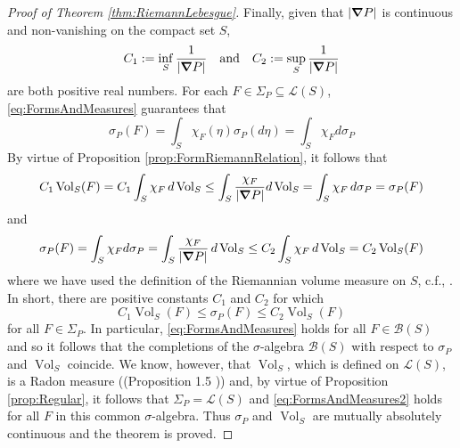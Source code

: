 \documentclass[11pt]{article}
\theoremstyle{remark}
\newcommand{\Vol}{\operatorname{Vol}}
\begin{document}
\begin{proof}[Proof of Theorem \ref{thm:RiemannLebesgue}]
Finally, given that $\abs{\grad P}$ is continuous and non-vanishing on the compact set $S$,
\begin{equation*}
    C_1 := \inf_S\frac{1}{|\grad P|}\quad\mbox{and}\quad C_2 := \sup_{S}\frac{1}{\abs{\grad P }}
\end{equation*}
are both positive real numbers. For each $F\in \Sigma_P\subseteq\mathcal{L}(S)$, \eqref{eq:FormsAndMeasures} guarantees that
\begin{equation*}
    \sigma_P(F)=\int_S\chi_F(\eta)\sigma_P(d\eta)=\int_S \chi_Fd\sigma_P
\end{equation*}
By virtue of Proposition \ref{prop:FormRiemannRelation}, it follows that
\begin{equation*}
C_1\Vol_S(F)=C_1\int_S \chi_F\,d\Vol_S\leq \int_S \frac{\chi_F}{|\grad P|}d\Vol_S=\int_S \chi_F\,d\sigma_P=\sigma_P(F)
\end{equation*}
and
\begin{equation*}
    \sigma_P(F)=\int_S\chi_F d\sigma_P=\int_S\frac{\chi_F}{|\grad P|}\,d\Vol_S\leq C_2\int_S\chi_F\,d\Vol_S=C_2\Vol_S(F)
\end{equation*}
where we have used the definition of the Riemannian volume measure on $S$, c.f., \cite{Amann2009}. In short, there are positive constants $C_1$ and $C_2$ for which
\begin{equation}\label{eq:FormsAndMeasures2}
    C_1\Vol_S(F)\leq\sigma_P(F)\leq C_2\Vol_S(F)
\end{equation}
for all $F\in\Sigma_P$. In particular, \eqref{eq:FormsAndMeasures} holds for all $F\in\mathcal{B}(S)$ and so it follows that the completions of the $\sigma$-algebra $\mathcal{B}(S)$ with respect to $\sigma_P$ and $\Vol_S$ coincide. We know, however, that $\Vol_S$, which is defined on $\mathcal{L}(S)$, is a Radon measure ((Proposition 1.5 \cite[Chapter XII]{Amann2009})) and, by virtue of Proposition \ref{prop:Regular}, it follows that $\Sigma_P=\mathcal{L}(S)$ and \eqref{eq:FormsAndMeasures2} holds for all $F$ in this common $\sigma$-algebra. Thus $\sigma_P$ and $\Vol_S$ are mutually absolutely continuous and the theorem is proved.
\end{proof}
\end{document}
